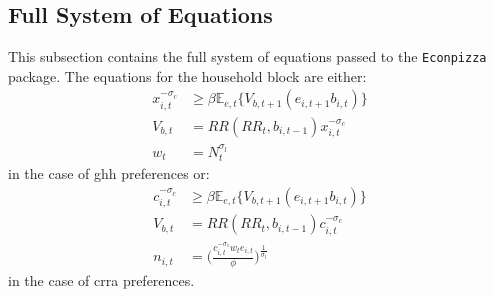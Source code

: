 \documentclass[a4paper,12pt]{article} %
\numberwithin{equation}{section} %
\numberwithin{figure}{section}
\numberwithin{table}{section}
\begin{document}
\begin{refsection}
\begin{appendices}
\subsection{Full System of Equations}
\label{sec-app:full-equations}

This subsection contains the full system of equations passed to the \texttt{Econpizza} package. The equations for the household block are either:
\begin{align}
    x_{i,t}^{-\sigma_c} &\ge \beta \mathbb{E}_{e,t} \{ V_{b,t+1} (e_{i,t+1} b_{i,t} ) \} \\
    V_{b,t} &= RR (RR_t, b_{i,t-1}) x_{i,t}^{-\sigma_c} \\
    w_t &= N_t^{\sigma_l}
\end{align}
in the case of \Gls{ghh} preferences or:
\begin{align}
    c_{i,t}^{-\sigma_c} &\ge \beta \mathbb{E}_{e,t} \{ V_{b,t+1} (e_{i,t+1} b_{i,t} ) \} \\
    V_{b,t} &= RR (RR_t, b_{i,t-1}) c_{i,t}^{-\sigma_c} \\
    n_{i,t} &= \Bigg( \frac{c_{i,t}^{-\sigma_c} w_t e_{i,t}}{\phi} \Bigg)^{\frac{1}{\sigma_l}}
\end{align}
in the case of \Gls{crra} preferences.


\end{appendices}
\end{refsection}
\end{document}
